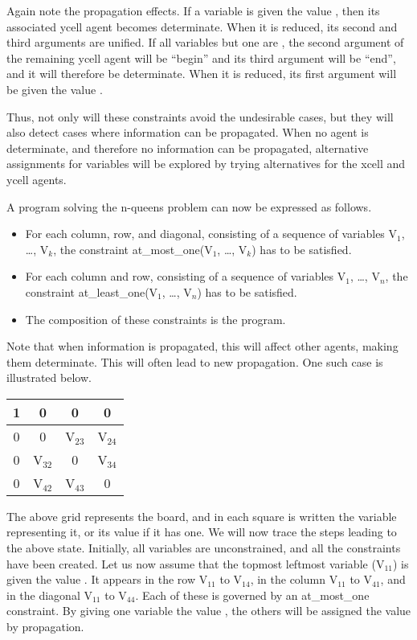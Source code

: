 Again note the propagation effects.  If a variable is given the value
{}, then its associated {\prog ycell} agent becomes
determinate.  When it is reduced, its second and third arguments are
unified.  If all variables but one are {}, the second argument
of the remaining {\prog ycell} agent will be ``{\prog begin}'' and its
third argument will be ``{\prog end}'', and it will therefore be
determinate.  When it is reduced, its first argument will be given the
value {}.

Thus, not only will these constraints avoid the undesirable cases, but
they will also detect cases where information can be propagated.  When
no agent is determinate, and therefore no information can be
propagated, alternative assignments for variables will be explored by
trying alternatives for the {\prog xcell} and {\prog ycell} agents.

A program solving the n-queens problem can now be expressed as follows.
%
\begin{itemize}
\item
For each column, row, and diagonal, consisting of a sequence of
variables {\prog V$_1$}, \dots, {\prog V$_k$}, the constraint {\prog
at_most_one(V$_1$, \dots, V$_k$)} has to be satisfied.
\item
For each column and row, consisting of a sequence of variables {\prog
V$_1$}, \dots, {\prog V$_n$}, the {\prog constraint at_least_one(V$_1$, \dots,
V$_n$)} has to be satisfied.
\item
The composition of these constraints is the program.
\end{itemize}
%
Note that when information is propagated, this will affect other
agents, making them determinate.  This will often lead to new
propagation.  One such case is illustrated below.
%
\begin{center}
\begin{tabular}{|c|c|c|c|}
\hline
1 & 0 & 0 & 0 \\
\hline
0 & 0 & V$_{23}$ & V$_{24}$ \\
\hline
0 & V$_{32}$ & 0 & V$_{34}$ \\
\hline
0 & V$_{42}$ & V$_{43}$ & 0 \\
\hline
\end{tabular}
\end{center}
%
The above grid represents the board, and in each square is written the
variable representing it, or its value if it has one.  We will now
trace the steps leading to the above state.  Initially, all variables
are unconstrained, and all the constraints have been created.  Let us
now assume that the topmost leftmost variable ({\prog V$_{11}$}) is
given the value {}.  It appears in the row {\prog V$_{11}$} to
{\prog V$_{14}$}, in the column {\prog V$_{11}$} to {\prog V$_{41}$},
and in the diagonal {\prog V$_{11}$} to {\prog V$_{44}$}.  Each of
these is governed by an {\prog at_most_one} constraint.  By giving one
variable the value {}, the others will be assigned the value
{} by propagation.


